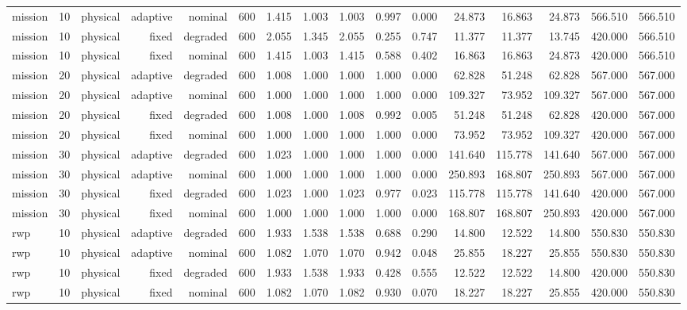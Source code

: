\begin{tabular}{lrrrrrrrrrrrrrrr}
mission & 10 & physical & adaptive & nominal & 600 & 1.415 & 1.003 & 1.003 & 0.997 & 0.000 & 24.873 & 16.863 & 24.873 & 566.510 & 566.510 \\
mission & 10 & physical & fixed & degraded & 600 & 2.055 & 1.345 & 2.055 & 0.255 & 0.747 & 11.377 & 11.377 & 13.745 & 420.000 & 566.510 \\
mission & 10 & physical & fixed & nominal & 600 & 1.415 & 1.003 & 1.415 & 0.588 & 0.402 & 16.863 & 16.863 & 24.873 & 420.000 & 566.510 \\
mission & 20 & physical & adaptive & degraded & 600 & 1.008 & 1.000 & 1.000 & 1.000 & 0.000 & 62.828 & 51.248 & 62.828 & 567.000 & 567.000 \\
mission & 20 & physical & adaptive & nominal & 600 & 1.000 & 1.000 & 1.000 & 1.000 & 0.000 & 109.327 & 73.952 & 109.327 & 567.000 & 567.000 \\
mission & 20 & physical & fixed & degraded & 600 & 1.008 & 1.000 & 1.008 & 0.992 & 0.005 & 51.248 & 51.248 & 62.828 & 420.000 & 567.000 \\
mission & 20 & physical & fixed & nominal & 600 & 1.000 & 1.000 & 1.000 & 1.000 & 0.000 & 73.952 & 73.952 & 109.327 & 420.000 & 567.000 \\
mission & 30 & physical & adaptive & degraded & 600 & 1.023 & 1.000 & 1.000 & 1.000 & 0.000 & 141.640 & 115.778 & 141.640 & 567.000 & 567.000 \\
mission & 30 & physical & adaptive & nominal & 600 & 1.000 & 1.000 & 1.000 & 1.000 & 0.000 & 250.893 & 168.807 & 250.893 & 567.000 & 567.000 \\
mission & 30 & physical & fixed & degraded & 600 & 1.023 & 1.000 & 1.023 & 0.977 & 0.023 & 115.778 & 115.778 & 141.640 & 420.000 & 567.000 \\
mission & 30 & physical & fixed & nominal & 600 & 1.000 & 1.000 & 1.000 & 1.000 & 0.000 & 168.807 & 168.807 & 250.893 & 420.000 & 567.000 \\
rwp & 10 & physical & adaptive & degraded & 600 & 1.933 & 1.538 & 1.538 & 0.688 & 0.290 & 14.800 & 12.522 & 14.800 & 550.830 & 550.830 \\
rwp & 10 & physical & adaptive & nominal & 600 & 1.082 & 1.070 & 1.070 & 0.942 & 0.048 & 25.855 & 18.227 & 25.855 & 550.830 & 550.830 \\
rwp & 10 & physical & fixed & degraded & 600 & 1.933 & 1.538 & 1.933 & 0.428 & 0.555 & 12.522 & 12.522 & 14.800 & 420.000 & 550.830 \\
rwp & 10 & physical & fixed & nominal & 600 & 1.082 & 1.070 & 1.082 & 0.930 & 0.070 & 18.227 & 18.227 & 25.855 & 420.000 & 550.830 \\

\end{tabular}
